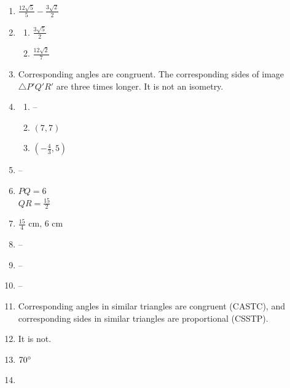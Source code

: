 \documentclass{article}
\begin{document}
\begin{enumerate}
\item $\frac{12\sqrt{5}}{5} - \frac{3\sqrt{2}}{2}$

\item

	\begin{enumerate}
	
	\item $\frac{3\sqrt{5}}{2}$
	
	\item $\frac{12\sqrt{2}}{7}$
	
	\end{enumerate}
	
\item Corresponding angles are congruent. The corresponding sides of image $\triangle P'Q'R'$ are three times longer. It is not an isometry.

\item

	\begin{enumerate}
	
	\item --
	
	\item $(7,7)$
	
	\item $(-\frac{4}{3}, 5)$
	
	\end{enumerate}
	
\item --

\item $PQ = 6$ \\
	$QR = \frac{15}{2}$
	
\item $\frac{15}{4} \text{ cm, } 6 \text{ cm}$

\item --

\item --

\item --

\item Corresponding angles in similar triangles are congruent (CASTC), and corresponding sides in similar triangles are proportional (CSSTP).

\item It is not.

\item $70\degree$

\item


\end{enumerate}
\end{document}
